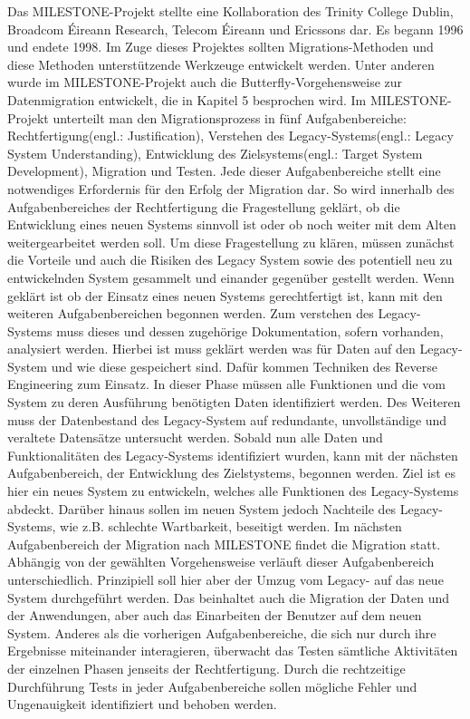 Das MILESTONE-Projekt stellte eine Kollaboration des Trinity College Dublin, Broadcom Éireann Research, Telecom Éireann und Ericssons dar. Es begann 1996 und endete 1998. Im Zuge dieses Projektes sollten Migrations-Methoden und diese Methoden unterstützende Werkzeuge entwickelt werden.\cite[S. 3]{wuLawless-1997} Unter anderen wurde im MILESTONE-Projekt auch die Butterfly-Vorgehensweise zur Datenmigration entwickelt, die in Kapitel 5 besprochen wird.\cite[S. 3]{wuLawless-1997} 
\lb
Im MILESTONE-Projekt unterteilt man den Migrationsprozess in fünf Aufgabenbereiche: Rechtfertigung(engl.: Justification), Verstehen des Legacy-Systems(engl.: Legacy System Understanding), Entwicklung des Zielsystems(engl.: Target System Development), Migration und Testen.\cite[S. 3]{wuLawless-1997} Jede dieser Aufgabenbereiche stellt eine notwendiges Erfordernis für den Erfolg der Migration dar. So wird innerhalb des Aufgabenbereiches der Rechtfertigung die Fragestellung geklärt, ob die Entwicklung eines neuen Systems sinnvoll ist oder ob noch weiter mit dem Alten weitergearbeitet werden soll. Um diese Fragestellung zu klären, müssen zunächst die Vorteile und auch die Risiken des Legacy System sowie des potentiell neu zu entwickelnden System gesammelt und einander gegenüber gestellt werden.\cite[S. 3]{wuLawless-1997}
\lb
Wenn geklärt ist ob der Einsatz eines neuen Systems gerechtfertigt ist, kann mit den weiteren Aufgabenbereichen begonnen werden. Zum verstehen des Legacy-Systems muss dieses und dessen zugehörige Dokumentation, sofern vorhanden, analysiert werden.\cite[S. 3f]{wuLawless-1997} Hierbei ist muss geklärt werden was für Daten auf den Legacy-System und wie diese gespeichert sind. Dafür kommen Techniken des Reverse Engineering zum Einsatz.\cite[S. 3f]{wuLawless-1997} In dieser Phase müssen alle Funktionen und die vom System zu deren Ausführung benötigten Daten identifiziert werden. Des Weiteren muss der Datenbestand des Legacy-System auf redundante, unvollständige und veraltete Datensätze untersucht werden.\cite[S. 3f]{wuLawless-1997}
\lb
Sobald nun alle Daten und Funktionalitäten des Legacy-Systems identifiziert wurden, kann mit der nächsten Aufgabenbereich, der Entwicklung des Zielstystems, begonnen werden. Ziel ist es hier ein neues System zu entwickeln, welches alle Funktionen des Legacy-Systems abdeckt. Darüber hinaus sollen im neuen System jedoch Nachteile des Legacy-Systems, wie z.B. schlechte Wartbarkeit, beseitigt werden.\cite[S. 3ff]{wuLawless-1997} 
\lb
Im nächsten Aufgabenbereich der Migration nach MILESTONE findet die Migration statt. Abhängig von der gewählten Vorgehensweise verläuft dieser Aufgabenbereich unterschiedlich. Prinzipiell soll hier aber der Umzug vom Legacy- auf das neue System durchgeführt werden. Das beinhaltet auch die Migration der Daten und der Anwendungen, aber auch das Einarbeiten der Benutzer auf dem neuen System.\cite[S. 3ff]{wuLawless-1997}
\lb
Anderes als die vorherigen Aufgabenbereiche, die sich nur durch ihre Ergebnisse miteinander interagieren, überwacht das Testen sämtliche Aktivitäten der einzelnen Phasen jenseits der Rechtfertigung. Durch die rechtzeitige Durchführung Tests in jeder Aufgabenbereiche sollen mögliche Fehler und Ungenauigkeit identifiziert  und behoben werden.\cite[S. 3f]{wuLawless-1997}

